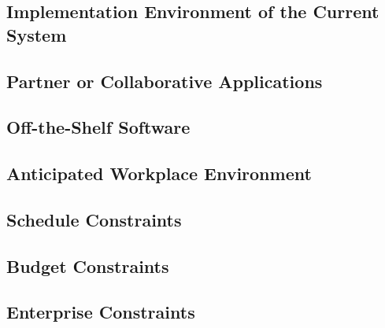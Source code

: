 \subsection{Implementation Environment of the Current System}

\subsection{Partner or Collaborative Applications}
\subsection{Off-the-Shelf Software}
\subsection{Anticipated Workplace Environment}
\subsection{Schedule Constraints}
\subsection{Budget Constraints}
\subsection{Enterprise Constraints}